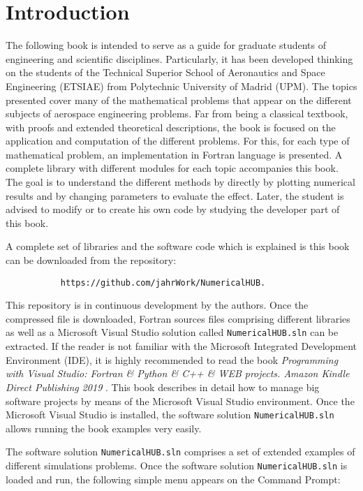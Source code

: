 \chapter*{Introduction}

The following book is intended to serve as a guide for graduate students of engineering and scientific disciplines. 
Particularly, it has been developed thinking on the students of the Technical Superior School of Aeronautics and Space Engineering (ETSIAE) from Polytechnic University of Madrid (UPM). 
The topics presented cover many of the mathematical problems that appear on the different subjects of aerospace engineering problems. Far from being a classical textbook, with proofs and extended theoretical descriptions, the book is focused on the application and computation of the different problems. 
For this, for each type of mathematical problem, an implementation in Fortran language is presented. A complete library with different modules for each topic accompanies this book. 
The goal is to understand the different methods by directly by plotting numerical results and by changing parameters to evaluate the effect. Later, the student is advised to modify or to create his own code by studying the developer part of this book.

A complete set of libraries and the software code which is explained is this book can be downloaded from the repository: 


\begin{verbatim}
           https://github.com/jahrWork/NumericalHUB. 
\end{verbatim}

 
This repository is in continuous development by the authors. 
Once the compressed file is downloaded, Fortran sources files comprising different libraries as well as a Microsoft Visual Studio solution called \texttt{NumericalHUB.sln} can be extracted.  
If the reader is not familiar with the Microsoft Integrated Development Environment (IDE), it is highly recommended to read the book \textit{Programming with Visual Studio: Fortran \& Python \& C++ \& WEB projects. Amazon Kindle Direct Publishing 2019 }. This book describes in detail how to manage big software projects by means of the Microsoft Visual Studio environment.  
Once the Microsoft Visual Studio is installed, the software solution \verb|NumericalHUB.sln|  allows running the book examples very easily. 


The software solution  \texttt{NumericalHUB.sln}  comprises a set of extended examples of different simulations problems. 
Once the software solution  \texttt{NumericalHUB.sln} is loaded and run, the following simple menu appears on the Command Prompt:

